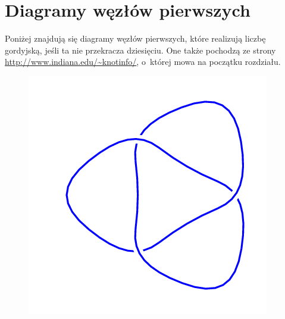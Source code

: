 \section{Diagramy węzłów pierwszych}
\label{sec:table_of_prime_knots}
Poniżej znajdują się diagramy węzłów pierwszych, które realizują liczbę gordyjską, jeśli ta nie przekracza dziesięciu.
One także pochodzą ze strony \url{http://www.indiana.edu/~knotinfo/}, o~której mowa na początku rozdziału.

\begin{figure}[H]
    \begin{minipage}[b]{.18\linewidth}
        \centering
        \includegraphics[width=\linewidth]{../data/3_1.png}
    \end{minipage}
    \begin{minipage}[b]{.18\linewidth}
        \centering

\end{minipage}
\end{figure}
